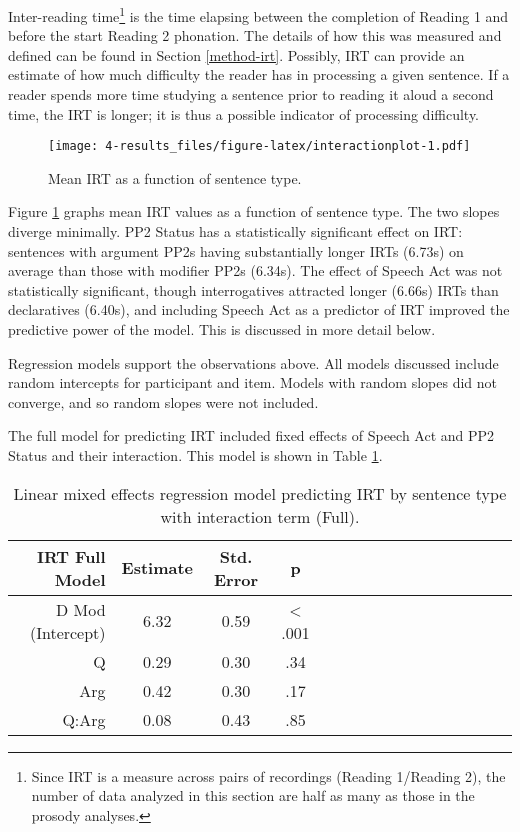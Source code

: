 \documentclass[11pt,oneside]{book}
\let\rmarkdownfootnote\footnote%
\def\footnote{\protect\rmarkdownfootnote}
\begin{document}
Inter-reading time\footnote{Since IRT is a measure across pairs of recordings (Reading 1/Reading 2), the number of data analyzed in this section are half as many as those in the prosody analyses.} is the time elapsing between the completion of Reading 1 and before the start Reading 2 phonation. The details of how this was measured and defined can be found in Section \ref{method-irt}. Possibly, IRT can provide an estimate of how much difficulty the reader has in processing a given sentence. If a reader spends more time studying a sentence prior to reading it aloud a second time, the IRT is longer; it is thus a possible indicator of processing difficulty.

\begin{figure}
\centering
\texttt{[image: 4-results\_files/figure-latex/interactionplot-1.pdf]}
\caption{\label{fig:interactionplot}Mean IRT as a function of sentence type.}
\end{figure}

Figure \ref{fig:interactionplot} graphs mean IRT values as a function of sentence type. The two slopes diverge minimally. PP2 Status has a statistically significant effect on IRT: sentences with argument PP2s having substantially longer IRTs (6.73s) on average than those with modifier PP2s (6.34s). The effect of Speech Act was not statistically significant, though interrogatives attracted longer (6.66s) IRTs than declaratives (6.40s), and including Speech Act as a predictor of IRT improved the predictive power of the model. This is discussed in more detail below.

Regression models support the observations above. All models discussed include random intercepts for participant and item. Models with random slopes did not converge, and so random slopes were not included.

The full model for predicting IRT included fixed effects of Speech Act and PP2 Status and their interaction. This model is shown in Table \ref{tab:hyp}.

\begin{table}[!h]

\caption{\label{tab:hyp}Linear mixed effects regression model predicting IRT by sentence type with interaction term (Full).}
\centering
\begin{tabular}{rcccrcccrcccrccc}
\toprule
IRT Full Model & Estimate & Std. Error & p\\
\midrule
D Mod (Intercept) & 6.32 & 0.59 & < .001\\
Q & 0.29 & 0.30 & .34\\
Arg & 0.42 & 0.30 & .17\\
Q:Arg & 0.08 & 0.43 & .85\\
\bottomrule
\end{tabular}
\end{table}
\end{document}
